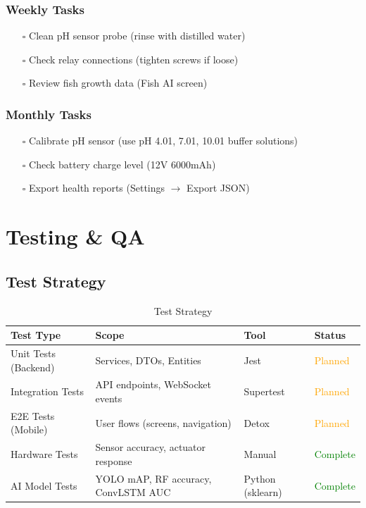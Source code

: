 \documentclass[12pt,a4paper,oneside]{article}
\begin{document}
\subsubsection{Weekly Tasks}
\begin{itemize}
    \item[$\square$] Clean pH sensor probe (rinse with distilled water)
    \item[$\square$] Check relay connections (tighten screws if loose)
    \item[$\square$] Review fish growth data (Fish AI screen)
\end{itemize}

\subsubsection{Monthly Tasks}
\begin{itemize}
    \item[$\square$] Calibrate pH sensor (use pH 4.01, 7.01, 10.01 buffer solutions)
    \item[$\square$] Check battery charge level (12V 6000mAh)
    \item[$\square$] Export health reports (Settings $\rightarrow$ Export JSON)
\end{itemize}

\newpage
\section{Testing \& QA}

\subsection{Test Strategy}
\begin{table}[H]
    \centering\small
    \begin{tabularx}{\textwidth}{YYll}
        \toprule
        \textbf{Test Type} & \textbf{Scope} & \textbf{Tool} & \textbf{Status} \\
        \midrule
        Unit Tests (Backend) & Services, DTOs, Entities & Jest & \textcolor{orange}{Planned} \\
        Integration Tests & API endpoints, WebSocket events & Supertest & \textcolor{orange}{Planned} \\
        E2E Tests (Mobile) & User flows (screens, navigation) & Detox & \textcolor{orange}{Planned} \\
        Hardware Tests & Sensor accuracy, actuator response & Manual & \textcolor{green}{Complete} \\
        AI Model Tests & YOLO mAP, RF accuracy, ConvLSTM AUC & Python (sklearn) & \textcolor{green}{Complete} \\
        \bottomrule
    \end{tabularx}
    \caption{Test Strategy}
\end{table}
\end{document}
